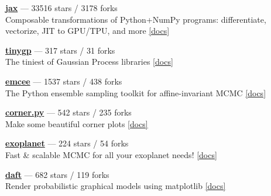 \item \href{https://github.com/jax-ml/jax}{{\bf jax}} --- 33516 stars / 3178 forks \\
Composable transformations of Python+NumPy programs: differentiate, vectorize, JIT to GPU/TPU, and more \href{https://docs.jax.dev}{[docs]}

\item \href{https://github.com/dfm/tinygp}{{\bf tinygp}} --- 317 stars / 31 forks \\
The tiniest of Gaussian Process libraries \href{https://tinygp.readthedocs.io}{[docs]}

\item \href{https://github.com/dfm/emcee}{{\bf emcee}} --- 1537 stars / 438 forks \\
The Python ensemble sampling toolkit for affine-invariant MCMC \href{https://emcee.readthedocs.io}{[docs]}

\item \href{https://github.com/dfm/corner.py}{{\bf corner.py}} --- 542 stars / 235 forks \\
Make some beautiful corner plots \href{http://corner.readthedocs.io}{[docs]}

\item \href{https://github.com/exoplanet-dev/exoplanet}{{\bf exoplanet}} --- 224 stars / 54 forks \\
Fast {\&} scalable MCMC for all your exoplanet needs!  \href{https://docs.exoplanet.codes}{[docs]}

\item \href{https://github.com/daft-dev/daft}{{\bf daft}} --- 682 stars / 119 forks \\
Render probabilistic graphical models using matplotlib \href{https://docs.daft-pgm.org}{[docs]}